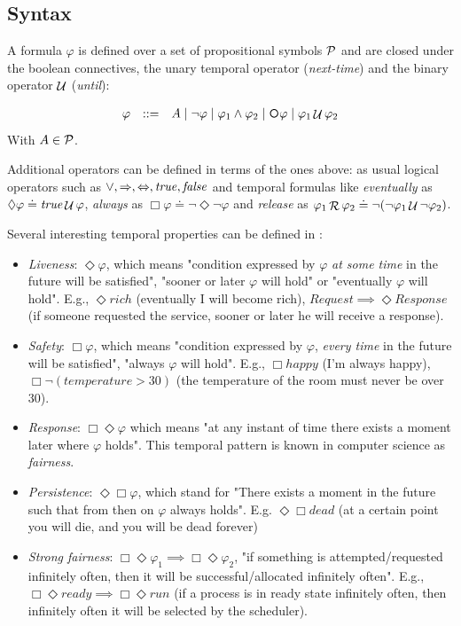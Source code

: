 \subsection{Syntax}\label{sect:ltl-syntax}
A \LTL formula $\varphi$ is defined over a set of propositional symbols $\mathcal{P}$ and are closed under the boolean connectives, the unary temporal operator \Next (\emph{next-time}) and the binary operator $\mathop{\mathcal{U}}$ (\emph{until}):

\[\begin{array}{rcl}
\varphi &::=& A \mid \lnot \varphi \mid \varphi_1\land \varphi_2 \mid \Next\varphi \mid \varphi_1 \lUntil \varphi_2
\end{array}
\]
With $A\in \mathcal{P}$.

Additional operators can be defined in terms of the ones above: as usual logical operators such as $\vee, \Rightarrow, \Leftrightarrow, \mathit{true}, \mathit{false}$ and temporal formulas like \emph{eventually} as $\Diamond \varphi \doteq \mathit{true} \mathop{\mathcal{U}} \varphi$, \emph{always} as $\Box \varphi \doteq \lnot \Diamond \lnot \varphi$ and \emph{release} as $\varphi_1 \mathop{\mathcal{R}} \varphi_2 \doteq \lnot (\lnot \varphi_1 \mathop{\mathcal{U}} \lnot \varphi_2)$.

\begin{example}\label{ltl-formula-examples}
Several interesting temporal properties can be defined in \LTL:
\begin{itemize}
	\item \emph{Liveness}: $\Diamond \varphi$, which means "condition expressed by $\varphi$ \emph{at some time} in the future will be satisfied", "sooner or later $\varphi$ will hold" or "eventually $\varphi$ will hold". E.g., $\Diamond rich$ (eventually I will become rich), $Request \implies \Diamond Response$ (if someone requested the service, sooner or later he will receive a response).
	\item \emph{Safety}: $\Box \varphi$, which means "condition expressed by $\varphi$, \emph{every time} in the future will be satisfied", "always $\varphi$ will hold". E.g., $\Box happy$ (I'm always happy), $\Box \lnot (temperature >30)$ (the temperature of the room must never be over 30).
	\item \emph{Response}: $\Box \Diamond \varphi$ which means "at any instant of time there exists a moment later where $\varphi$ holds". This temporal pattern is known in computer science as \emph{fairness}.
	\item \emph{Persistence}: $\Diamond \Box \varphi$, which stand for "There exists a moment in the future such that from then on $\varphi$ always holds". E.g. $\Diamond \Box dead$ (at a certain point you will die, and you will be dead forever)
	\item \emph{Strong fairness}: $\Box \Diamond \varphi_1 \implies \Box \Diamond \varphi_2$, "if something is attempted/requested infinitely often, then it will be successful/allocated infinitely often". E.g., $\Box \Diamond ready \implies \Box \Diamond run$ (if a process is in ready state infinitely often, then infinitely often it will be selected by the scheduler).
\end{itemize}
\end{example}

